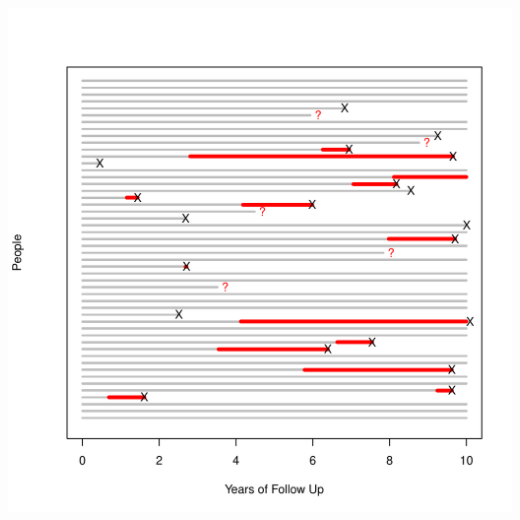 \documentclass{article}\usepackage{graphicx, color}
\newenvironment{knitrout}{}{} %
\begin{document}
\begin{knitrout}
\color{fgcolor}\includegraphics[width=6in]{figure/inclass} 
\end{knitrout}
\end{document}
